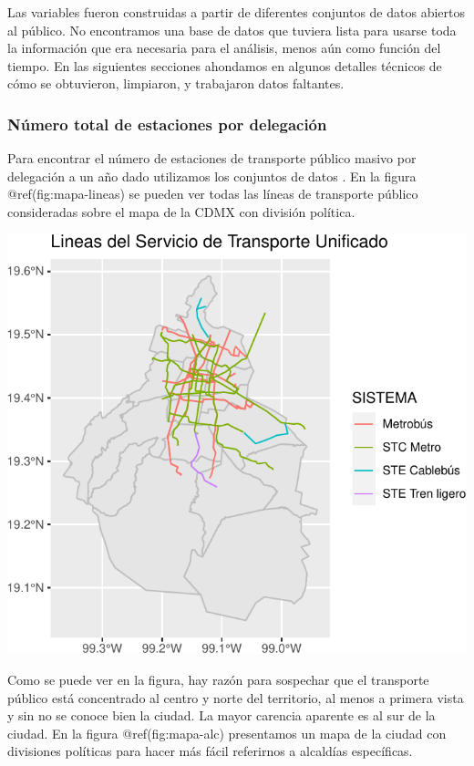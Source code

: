 \documentclass[
  spanish,
]{article}
\begin{document}
Las variables fueron construidas a partir de diferentes conjuntos de
datos abiertos al público. No encontramos una base de datos que tuviera
lista para usarse toda la información que era necesaria para el
análisis, menos aún como función del tiempo. En las siguientes secciones
ahondamos en algunos detalles técnicos de cómo se obtuvieron, limpiaron,
y trabajaron datos faltantes.

\hypertarget{nuxfamero-total-de-estaciones-por-delegaciuxf3n}{%
\subsubsection{Número total de estaciones por
delegación}\label{nuxfamero-total-de-estaciones-por-delegaciuxf3n}}

Para encontrar el número de estaciones de transporte público masivo por
delegación a un año dado utilizamos los conjuntos de datos
\cite{metrobus,
metro, corredorverde}. En la figura @ref(fig:mapa-lineas) se pueden ver
todas las líneas de transporte público consideradas sobre el mapa de la
CDMX con división política.

\begin{center}\includegraphics{proyecto_files/figure-latex/mapa-lineas-1} \end{center}

Como se puede ver en la figura, hay razón para sospechar que el
transporte público está concentrado al centro y norte del territorio, al
menos a primera vista y sin no se conoce bien la ciudad. La mayor
carencia aparente es al sur de la ciudad. En la figura
@ref(fig:mapa-alc) presentamos un mapa de la ciudad con divisiones
políticas para hacer más fácil referirnos a alcaldías específicas.
\end{document}
